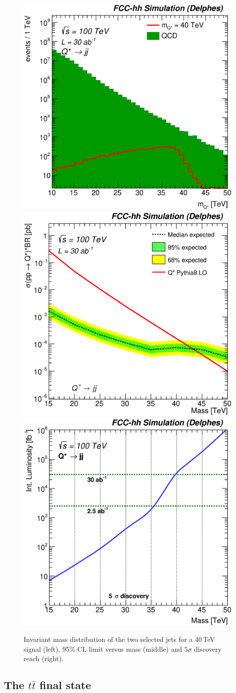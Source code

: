 \documentclass[a4paper,11pt]{article}
\newcommand*{\ttbar}{\ensuremath{t\bar{t}}}
\begin{document}
\begin{figure}[!htb]
  \centering
  \includegraphics[width=0.32\columnwidth]{Fig/Mj1j2_pf04_sel1_nostack_log.eps}
  \includegraphics[width=0.32\columnwidth]{Fig/lim_Qstar_jj_fcc_v02.eps}
  \includegraphics[width=0.32\columnwidth]{Fig/DiscoveryPotential_jj_rootStyle.eps}
   \caption{Invariant mass distribution of the two selected jets for a 40\,TeV signal (left), 95\% CL limit versus mass (middle) and $5\sigma$ discovery reach (right).}
  \label{figure:hadronicresonances:jj}
\end{figure}

\subsection{The \texorpdfstring{\ttbar}{tt} final state}
\label{sec:hadtt}
\end{document}
